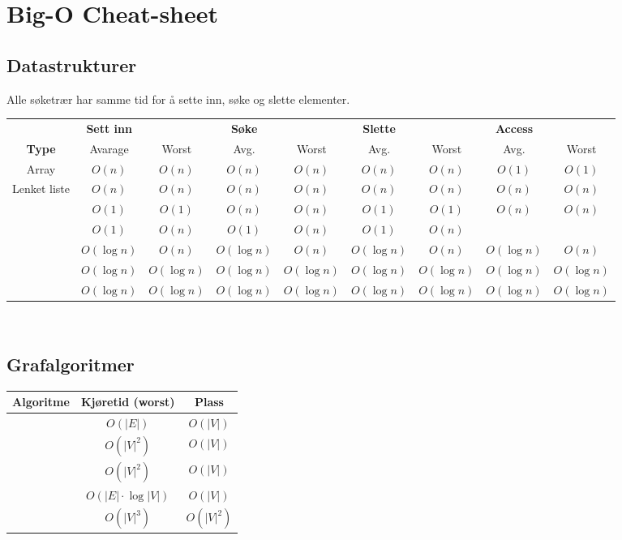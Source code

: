\section{\color{red} Big-O Cheat-sheet}
\subsection*{Datastrukturer}
Alle søketrær har samme tid for å sette inn, søke og slette elementer.

\begin{table}[H]
\footnotesize
\centering
\begin{tabular}{c || c  c | c c | c c | c c} 
	                   & \textbf{Sett inn} &               & \textbf{Søke} & & \textbf{Slette} & & \textbf{Access} & \\
	 \textbf{Type}     & {Avarage}         & {Worst}       &Avg.&Worst&Avg.&Worst&Avg.&Worst\\ \hline
	 Array & $ O(n) $ & $ O(n) $ & $ O(n) $ & $ O(n) $ & $ O(n) $ & $ O(n) $ & $ O(1) $ & $ O(1) $ \\
	 Lenket liste & $ O(n) $ & $ O(n) $ & $ O(n) $ & $ O(n) $ & $ O(n) $ & $ O(n) $ & $ O(n) $ & $ O(n) $ \\
	 \nameref{ko_stack} & $ O(1) $ & $ O(1) $ & $ O(n) $ & $ O(n) $ & $ O(1) $ & $ O(1) $ & $ O(n) $ & $ O(n) $ \\
	 \nameref{hashmap} & $ O(1) $ & $ O(n) $ & $ O(1) $ & $ O(n) $ & $ O(1) $ & $ O(n) $ & & \\
	\nameref{bintraer} & $ O(\log n) $     & $ O(n) $   & $ O(\log n) $     & $ O(n) $  & $ O(\log n) $     & $ O(n) $  & $ O(\log n) $     & $ O(n) $ \\
	 \nameref{rb_tre}  & $ O(\log n) $     & $ O(\log n) $ & $ O(\log n) $     & $ O(\log n) $& $ O(\log n) $     & $ O(\log n) $& $ O(\log n) $     & $ O(\log n) $\\
	 \nameref{b-tre}   & $ O(\log n) $     & $ O(\log n) $ & $ O(\log n) $     & $ O(\log n) $& $ O(\log n) $     & $ O(\log n) $& $ O(\log n) $     & $ O(\log n) $
\end{tabular}
\end{table}


~\\\subsection*{Grafalgoritmer}
\begin{center}
\begin{tabular}{c || c | c}
	\textbf{Algoritme} & \textbf{Kjøretid (worst)}   & \textbf{Plass} \\ \hline
	  \nameref{dfs}    & $ O(|E|) $                  & $ O(|V|) $     \\
	\nameref{dijkstra} & $ O(|V|^2) $                & $ O(|V|) $     \\
	  \nameref{prim}   & $ O(|V|^2) $                & $ O(|V|) $     \\
	\nameref{kruskal}  & $ O(|E| \cdot \log |V|) $ & $ O(|V|) $     \\
	 \nameref{floyd}   & $ O(|V|^3) $                & $ O(|V|^2) $
\end{tabular}
\end{center}


